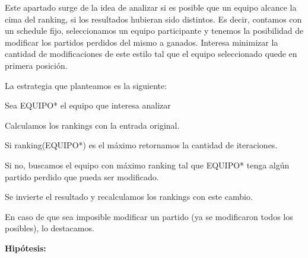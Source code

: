 Este apartado surge de la idea de analizar si es posible que un equipo alcance la cima del ranking, si los resultados hubieran sido distintos. Es decir, contamos con un schedule fijo, seleccionamos un equipo participante y tenemos la posibilidad de modificar los partidos perdidos del mismo a ganados. Interesa minimizar la cantidad de modificaciones de este estilo tal que el equipo seleccionado quede en primera posici\'on.

La estrategia que planteamos es la siguiente:

Sea EQUIPO* el equipo que interesa analizar

Calculamos los rankings con la entrada original.

Si ranking(EQUIPO*) es el m\'aximo retornamos la cantidad de iteraciones.

Si no, buscamos el equipo con m\'aximo ranking tal que EQUIPO* tenga alg\'un partido perdido que pueda ser modificado.

Se invierte el resultado y recalculamos los rankings con este cambio.

En caso de que sea imposible modificar un partido (ya se modificaron todos los posibles), lo destacamos.

\textbf{Hip\'otesis:} 

